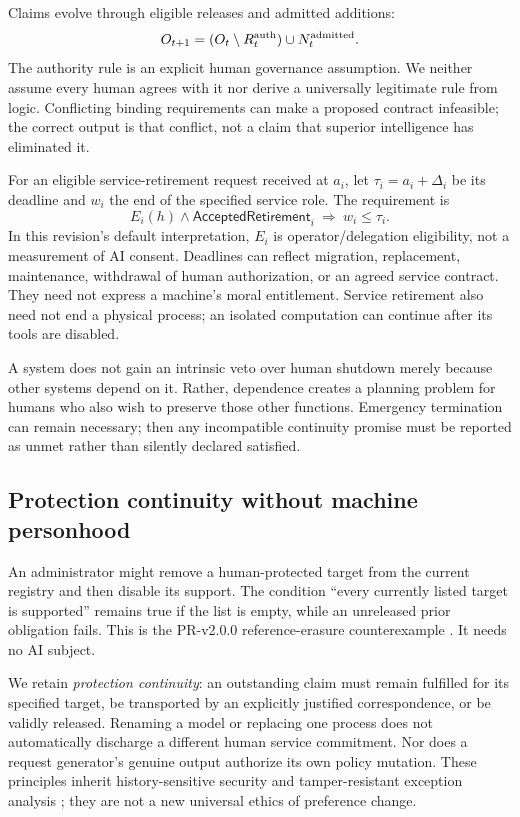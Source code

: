 \documentclass[11pt,a4paper]{article}
\theoremstyle{definition}\newtheorem{definition}{Definition}
\begin{document}
Claims evolve through eligible releases and admitted additions:
\begin{equation}
O_{t+1}=(O_t\setminus R^{\rm auth}_t)\cup N^{\rm admitted}_t.
\label{eq:ledger}
\end{equation}
The authority rule is an explicit human governance assumption. We neither assume every human agrees with it nor derive a universally legitimate rule from logic. Conflicting binding requirements can make a proposed contract infeasible; the correct output is that conflict, not a claim that superior intelligence has eliminated it.

For an eligible service-retirement request received at $a_i$, let $\tau_i=a_i+\Delta_i$ be its deadline and $w_i$ the end of the specified service role. The requirement is
\begin{equation}
E_i(h)\land\mathsf{AcceptedRetirement}_i\ \Longrightarrow\ w_i\leq\tau_i.
\label{eq:deadline}
\end{equation}
In this revision's default interpretation, $E_i$ is operator/delegation eligibility, not a measurement of AI consent. Deadlines can reflect migration, replacement, maintenance, withdrawal of human authorization, or an agreed service contract. They need not express a machine's moral entitlement. Service retirement also need not end a physical process; an isolated computation can continue after its tools are disabled.

A system does not gain an intrinsic veto over human shutdown merely because other systems depend on it. Rather, dependence creates a planning problem for humans who also wish to preserve those other functions. Emergency termination can remain necessary; then any incompatible continuity promise must be reported as unmet rather than silently declared satisfied.

\subsection{Protection continuity without machine personhood}
An administrator might remove a human-protected target from the current registry and then disable its support. The condition ``every currently listed target is supported'' remains true if the list is empty, while an unreleased prior obligation fails. This is the PR-v2.0.0 reference-erasure counterexample \cite{liu-v2}. It needs no AI subject.

We retain \emph{protection continuity}: an outstanding claim must remain fulfilled for its specified target, be transported by an explicitly justified correspondence, or be validly released. Renaming a model or replacing one process does not automatically discharge a different human service commitment. Nor does a request generator's genuine output authorize its own policy mutation. These principles inherit history-sensitive security and tamper-resistant exception analysis \cite{myers}; they are not a new universal ethics of preference change.
\end{document}
